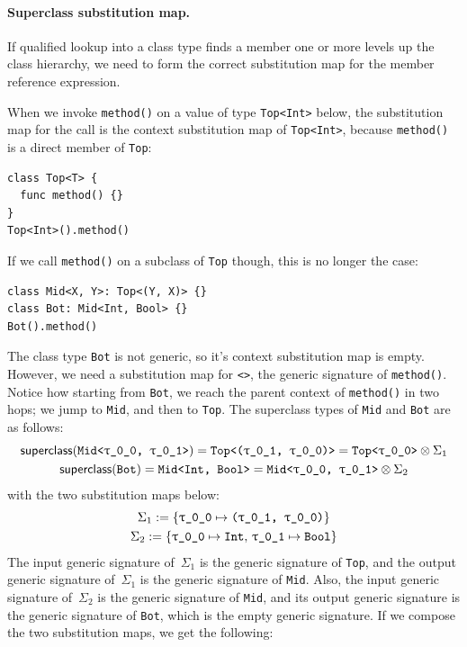 \documentclass[../generics]{subfiles}
\begin{document}
\paragraph{Superclass substitution map.} If qualified lookup into a class type finds a member one or more levels up the class hierarchy, we need to form the correct substitution map for the member reference expression.
\begin{example}
When we invoke \texttt{method()} on a value of type \texttt{Top<Int>} below, the substitution map for the call is the context substitution map of \texttt{Top<Int>}, because \texttt{method()} is a direct member of \texttt{Top}:
\begin{Verbatim}
class Top<T> {
  func method() {}
}
Top<Int>().method()
\end{Verbatim}
If we call \texttt{method()} on a subclass of \texttt{Top} though, this is no longer the case:
\begin{Verbatim}
class Mid<X, Y>: Top<(Y, X)> {}
class Bot: Mid<Int, Bool> {}
Bot().method()
\end{Verbatim}
The class type \texttt{Bot} is not generic, so it's context substitution map is empty. However, we need a substitution map for \texttt{<\rT>}, the generic signature of \texttt{method()}. Notice how starting from \texttt{Bot}, we reach the parent context of \texttt{method()} in two hops; we jump to \texttt{Mid}, and then to \texttt{Top}. The superclass types of \texttt{Mid} and \texttt{Bot} are as follows:
\begin{gather*}
\mathsf{superclass}(\texttt{Mid<\rT, \rU>}) = \texttt{Top<(\rU, \rT)>} = \texttt{Top<\rT>} \otimes \Sigma_1\\
\mathsf{superclass}(\texttt{Bot}) = \texttt{Mid<Int, Bool>} = \texttt{Mid<\rT, \rU>} \otimes \Sigma_2
\end{gather*}
with the two substitution maps below:
\begin{gather*}
\Sigma_1 := \SubstMap{\SubstType{\rT}{(\rU, \rT)}}\\
\Sigma_2 := \SubstMap{\SubstType{\rT}{Int},\,\SubstType{\rU}{Bool}}
\end{gather*}
The input generic signature of~$\Sigma_1$ is the generic signature of \texttt{Top}, and the output generic signature of~$\Sigma_1$ is the generic signature of \texttt{Mid}. Also, the input generic signature of~$\Sigma_2$ is the generic signature of \texttt{Mid}, and its output generic signature is the generic signature of \texttt{Bot}, which is the empty generic signature. If we compose the two substitution maps, we get the following:

\end{example}
\end{document}
